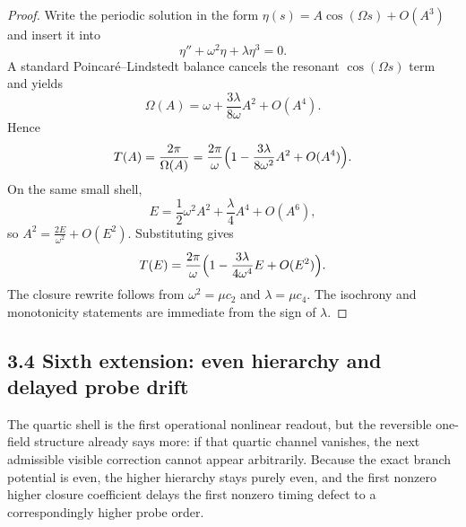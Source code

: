 \begin{proof}
Write the periodic solution in the form $\eta(s)=A\cos(\Omega s)+O(A^3)$ and insert it into
\[
  \eta''+\omega^2\eta+\lambda\eta^3=0.
\]
A standard Poincar\'e--Lindstedt balance cancels the resonant $\cos(\Omega s)$ term and yields
\[
  \Omega(A)=\omega+\frac{3\lambda}{8\omega}A^2+O(A^4).
\]
Hence
\[
  T(A)=\frac{2\pi}{\Omega(A)}
  =\frac{2\pi}{\omega}\Bigl(1-\frac{3\lambda}{8\omega^2}A^2+O(A^4)\Bigr).
\]
On the same small shell,
\[
  E=\frac12\omega^2A^2+\frac{\lambda}{4}A^4+O(A^6),
\]
so $A^2=\tfrac{2E}{\omega^2}+O(E^2)$. Substituting gives
\[
  T(E)=\frac{2\pi}{\omega}\Bigl(1-\frac{3\lambda}{4\omega^4}E+O(E^2)\Bigr).
\]
The closure rewrite follows from $\omega^2=\mu c_2$ and $\lambda=\mu c_4$. The isochrony and monotonicity statements are immediate from the sign of $\lambda$.
\end{proof}


\subsection*{3.4 Sixth extension: even hierarchy and delayed probe drift}
The quartic shell is the first operational nonlinear readout, but the reversible one-field structure already says more: if that quartic channel vanishes, the next admissible visible correction cannot appear arbitrarily. Because the exact branch potential is even, the higher hierarchy stays purely even, and the first nonzero higher closure coefficient delays the first nonzero timing defect to a correspondingly higher probe order.

